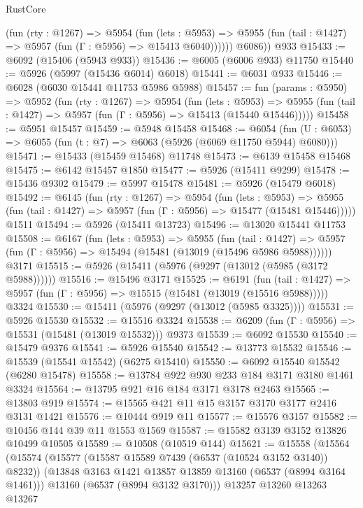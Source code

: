 \begin{lexlean}{RustCore}
\begin{coremodule}
            (fun (rty : @1267) =>
            @5954
              (fun (lets : @5953) =>
              @5955 (fun (tail : @1427) => @5957 (fun (Γ : @5956) => @15413 @6040))))))
        @6086))
    @933
@15433 := @6092 (@15406 (@5943 @933))
@15436 := @6005 (@6006 @933) @11750
@15440 := @5926 (@5997 (@15436 @6014) @6018)
@15441 := @6031 @933
@15446 := @6028 (@6030 @15441 @11753 @5986 @5988)
@15457 := fun (params : @5950) =>
  @5952
    (fun (rty : @1267) =>
    @5954
      (fun (lets : @5953) =>
      @5955 (fun (tail : @1427) => @5957 (fun (Γ : @5956) => @15413 (@15440 @15446)))))
@15458 := @5951 @15457
@15459 := @5948 @15458
@15468 := @6054
    (fun (U : @6053) => @6055 (fun (t : @7) => @6063 (@5926 (@6069 @11750 @5944) @6080)))
@15471 := @15433 (@15459 @15468) @11748
@15473 := @6139 @15458 @15468
@15475 := @6142 @15457 @1850
@15477 := @5926 (@15411 @9299)
@15478 := @15436 @9302
@15479 := @5997 @15478
@15481 := @5926 (@15479 @6018)
@15492 := @6145
    (fun (rty : @1267) =>
    @5954
      (fun (lets : @5953) =>
      @5955 (fun (tail : @1427) => @5957 (fun (Γ : @5956) => @15477 (@15481 @15446)))))
    @1511
@15494 := @5926 (@15411 @13723)
@15496 := @13020 @15441 @11753
@15508 := @6167
    (fun (lets : @5953) =>
    @5955
      (fun (tail : @1427) =>
      @5957 (fun (Γ : @5956) => @15494 (@15481 (@13019 (@15496 @5986 @5988))))))
    @3171
@15515 := @5926 (@15411 (@5976 (@9297 (@13012 (@5985 (@3172 @5988))))))
@15516 := @15496 @3171
@15525 := @6191
    (fun (tail : @1427) => @5957 (fun (Γ : @5956) => @15515 (@15481 (@13019 (@15516 @5988)))))
    @3324
@15530 := @15411 (@5976 (@9297 (@13012 (@5985 @3325))))
@15531 := @5926 @15530
@15532 := @15516 @3324
@15538 := @6209 (fun (Γ : @5956) => @15531 (@15481 (@13019 @15532))) @9373
@15539 := @6092 @15530
@15540 := @15479 @9376
@15541 := @5926 @15540
@15542 := @13773 @15532
@15546 := @15539 (@15541 @15542) (@6275 @15410)
@15550 := @6092 @15540 @15542 (@6280 @15478)
@15558 := @13784 @922 @930 @233 @184 @3171 @3180 @1461 @3324
@15564 := @13795 @921 @16 @184 @3171 @3178 @2463
@15565 := @13803 @919
@15574 := @15565 @421 @11 @15 @3157 @3170 @3177 @2416 @3131 @1421
@15576 := @10444 @919 @11
@15577 := @15576 @3157
@15582 := @10456 @144 @39 @11 @1553 @1569
@15587 := @15582 @3139 @3152 @13826 @10499 @10505
@15589 := @10508 (@10519 @144)
@15621 := @15558
    (@15564
      (@15574
        (@15577 (@15587 @15589 @7439 (@6537 (@10524 @3152 @3140)) @8232))
        (@13848 @3163 @1421 @13857 @13859 @13160 (@6537 (@8994 @3164 @1461)))
        @13160
        (@6537 (@8994 @3132 @3170)))
      @13257
      @13260
      @13263
      @13267

\end{coremodule}
\end{lexlean}
